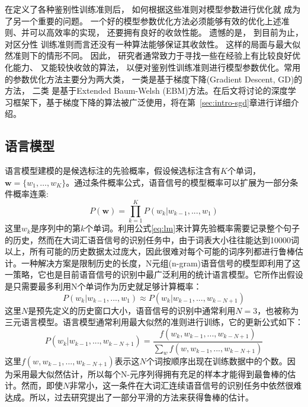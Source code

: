 在定义了各种鉴别性训练准则后， 如何根据这些准则对模型参数进行优化就
成为了另一个重要的问题。 一个好的模型参数优化方法必须能够有效的优化上述准则、并可以高效率的实现， 还要拥有良好的收敛性能。 遗憾的是， 到目前为止， 对区分性
训练准则而言还没有一种算法能够保证其收敛性。 这样的局面与最大似然准则下的情形不同。 因此， 研究者通常致力于寻找一些在经验上有比较良好优化能力、 又能较快收敛的算法， 以便对鉴别性训练准则进行模型参数优化。常用的参数优化方法主要分为两大类， 一类是基于梯度下降(Gradient Descent, GD)的方法， 二类
是基于Extended Baum-Welsh (EBM)方法。在后文将讨论的深度学习框架下，基于梯度下降的算法被广泛使用，将在第~\ref{sec:intro-sgd}章进行详细介绍。

\subsection{语言模型}
\label{sec:lm}
语言模型建模的是候选标注的先验概率，假设候选标注含有$K$个单词，$\mathbf{w}=\{w_1, \dots, w_K\}$。通过条件概率公式，语音信号的模型概率可以扩展为一部分条件概率连乘:
\begin{equation}
    \label{eq:lm}
    P(\mathbf{w})=\prod_{k=1}^{K}P(w_k|w_{k-1}, ..., w_1)
\end{equation}
这里$w_k$是序列中的第$k$个单词。利用公式\ref{eq:lm}来计算先验概率需要记录整个句子的历史，然而在大词汇语音信号的识别任务中，由于词表大小往往能达到10000词以上，所有可能的历史数据太过庞大，因此很难对每个可能的词序列都进行鲁棒估计。一种解决方案是限制历史的长度，N元组(n-gram)语音信号的模型即利用了这一策略，它也是目前语音信号的识别中最广泛利用的统计语言模型。它所作出假设是只需要最多利用N个单词作为历史就足够计算概率：
\begin{equation}
    P(w_k|w_{k-1}, ..., w_1) \approx P(w_k|w_{k-1}, ..., w_{k-N+1})
\end{equation}
这里$N$是预先定义的历史窗口大小，语音信号的识别中通常利用$N=3$，也被称为三元语言模型。语言模型通常利用最大似然的准则进行训练，它的更新公式如下：
\begin{equation}
    P(w_k|w_{k-1}, ..., w_{k-N+1})=\frac{f(w_k,w_{k-1},...,w_{k-N+1})}{\sum_wf(w,w_{k-1},...,w_{k-N+1})}
\end{equation}
这里$f(w,w_{k-1},...,w_{k-N+1})$表示这$N$个词按顺序出现在训练数据中的个数。因为采用最大似然估计，所以每个N-元序列得拥有充足的样本才能得到最鲁棒的估计。然而，即使$N$非常小，这一条件在大词汇连续语音信号的识别任务中依然很难达成。所以，过去研究提出了一部分平滑的方法来获得鲁棒的估计。
